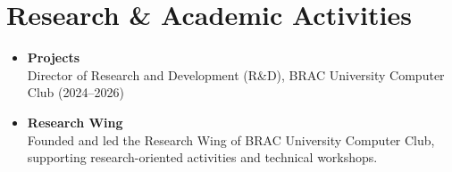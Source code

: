 \section{Research \& Academic Activities}

\begin{itemize}

    \item \textbf{Projects}\\
    Director of Research and Development (R\&D), BRAC University Computer Club (2024--2026)

    \item \textbf{Research Wing}\\
    Founded and led the Research Wing of BRAC University Computer Club, supporting research-oriented activities and technical workshops.

\end{itemize}

\endinput